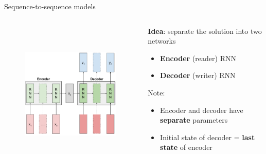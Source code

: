 \documentclass[12pt,aspectratio=169,handout]{beamer}
\begin{document}
\begin{frame}{Sequence-to-sequence models}

\begin{columns}[T] %
	\begin{column}{.59\textwidth}
	
		\begin{figure}[h]
		\includegraphics[height=7cm]{sequence_to_sequence_boxed.pdf}
	\end{figure}
	
	\end{column}
	\pause
	\begin{column}{.39\textwidth}
		\vspace{1cm}
		\textbf{Idea}: separate the solution into two networks
		\begin{itemize}
			\item \textbf{Encoder} (reader) RNN
			\item \textbf{Decoder} (writer) RNN
		\end{itemize}
		\pause
		Note:
		\begin{itemize}
			\item Encoder and decoder have \textbf{separate} parameters
			\item Initial state of decoder = \textbf{last state} of encoder
		\end{itemize}
	\end{column}
\end{columns}
\end{frame}
	
	
\end{document}
